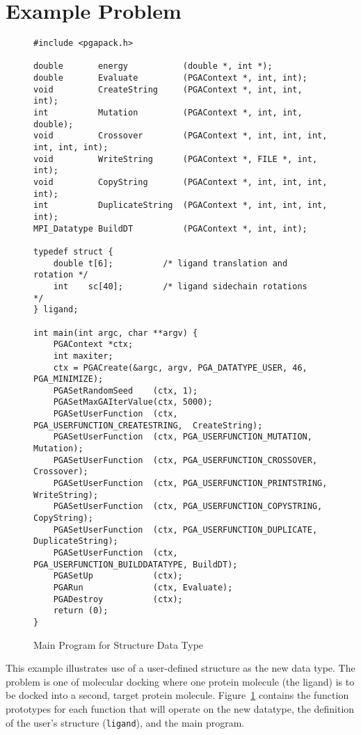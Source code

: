 \documentclass{report}
\begin{document}
\section{Example Problem}

\begin{figure}
\begin{verbatim}
#include <pgapack.h>

double       energy           (double *, int *);
double       Evaluate         (PGAContext *, int, int);
void         CreateString     (PGAContext *, int, int, int);
int          Mutation         (PGAContext *, int, int, double);
void         Crossover        (PGAContext *, int, int, int, int, int, int);
void         WriteString      (PGAContext *, FILE *, int, int);
void         CopyString       (PGAContext *, int, int, int, int);
int          DuplicateString  (PGAContext *, int, int, int, int);
MPI_Datatype BuildDT          (PGAContext *, int, int);

typedef struct {
    double t[6];          /* ligand translation and rotation */
    int    sc[40];        /* ligand sidechain rotations      */
} ligand;

int main(int argc, char **argv) {
    PGAContext *ctx;
    int maxiter;
    ctx = PGACreate(&argc, argv, PGA_DATATYPE_USER, 46, PGA_MINIMIZE);
    PGASetRandomSeed    (ctx, 1);
    PGASetMaxGAIterValue(ctx, 5000);
    PGASetUserFunction  (ctx, PGA_USERFUNCTION_CREATESTRING,  CreateString);
    PGASetUserFunction  (ctx, PGA_USERFUNCTION_MUTATION,      Mutation);
    PGASetUserFunction  (ctx, PGA_USERFUNCTION_CROSSOVER,     Crossover);
    PGASetUserFunction  (ctx, PGA_USERFUNCTION_PRINTSTRING,   WriteString);
    PGASetUserFunction  (ctx, PGA_USERFUNCTION_COPYSTRING,    CopyString);
    PGASetUserFunction  (ctx, PGA_USERFUNCTION_DUPLICATE,     DuplicateString);
    PGASetUserFunction  (ctx, PGA_USERFUNCTION_BUILDDATATYPE, BuildDT);
    PGASetUp            (ctx);
    PGARun              (ctx, Evaluate);
    PGADestroy          (ctx);
    return (0);
}
\end{verbatim}
\caption{Main Program for Structure Data Type}
\label{example1:new-datatype-main}
\end{figure}

This example illustrates use of a user-defined structure as the new data type.
The problem is one of molecular docking where one protein molecule (the
ligand) is to be docked into a second, target protein molecule.
Figure~\ref{example1:new-datatype-main} contains the function prototypes for
each function that will operate on the new datatype, the definition of the
user's structure ({\tt ligand}), and the main program.
\end{document}
